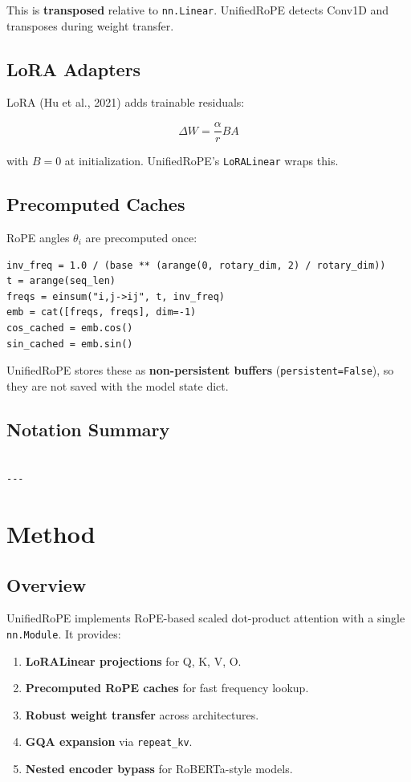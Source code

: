 {This is \textbf{transposed} relative to \texttt{nn.Linear}. UnifiedRoPE detects Conv1D 
and transposes during weight transfer.

\subsection{LoRA Adapters}

LoRA (Hu et al., 2021) adds trainable residuals:

\[
\Delta W = \frac{\alpha}{r} B A
\tag{3.8}
\]

with $B = 0$ at initialization. UnifiedRoPE's \texttt{LoRALinear} wraps this.

\subsection{Precomputed Caches}

RoPE angles $\theta_i$ are precomputed once:

\begin{lstlisting}
inv_freq = 1.0 / (base ** (arange(0, rotary_dim, 2) / rotary_dim))
t = arange(seq_len)
freqs = einsum("i,j->ij", t, inv_freq)
emb = cat([freqs, freqs], dim=-1)
cos_cached = emb.cos()
sin_cached = emb.sin()
\end{lstlisting}

UnifiedRoPE stores these as \textbf{non-persistent buffers} (\texttt{persistent=False}), 
so they are not saved with the model state dict.

\subsection{Notation Summary}

\begin{lstlisting}

---
\end{lstlisting}


\section{Method}

\subsection{Overview}

UnifiedRoPE implements RoPE-based scaled dot-product attention with a 
single \texttt{nn.Module}. It provides:

\begin{enumerate}
\item \textbf{LoRALinear projections} for Q, K, V, O.
\item \textbf{Precomputed RoPE caches} for fast frequency lookup.
\item \textbf{Robust weight transfer} across architectures.
\item \textbf{GQA expansion} via \texttt{repeat\_kv}.
\item \textbf{Nested encoder bypass} for RoBERTa-style models.


\end{enumerate}}
